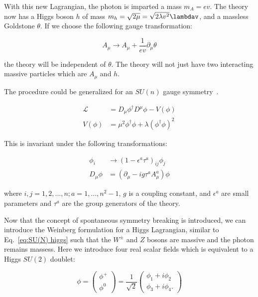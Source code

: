 With this new Lagrangian, the photon is imparted a mass $m_A = ev$. The theory now has a Higgs boson $h$ of mass $m_h = \sqrt{2\mu} =\sqrt{2\lambda v^2} \lambdav$, and a massless Goldstone $\theta$. If we choose the following gauge transformation:

\begin{equation}
\label{eq:GoldstoneGauge}
A_{\mu} \rightarrow A_{\mu} + \frac{1}{ev}\partial_{\mu}\theta
\end{equation}

the theory will be independent of $\theta$. The theory will not just have two interacting massive particles which are $A_\mu$ and $h$. 

The procedure could be generalized for an $SU(n)$ gauge symmetry~\cite{MarkusKluteLectures}. 

\begin{equation}
\begin{split}
\label{eq:SU(N) higgs}
    \mathcal{L} &= D_{\mu}\phi^{\dagger}D^{\mu}\phi - V(\phi) \\
     V(\phi) &= \mu^2\phi^{\dagger}\phi + \lambda(\phi^{\dagger}\phi)^2
\end{split}
\end{equation}

This is invariant under the following transformations:

\begin{equation}
\begin{split}
\label{eq:SU(N)transformation}
    \phi_{i} &\rightarrow (1-\epsilon^{a}\tau^{a})_{ij} \phi_j\\
    D_{\mu} \phi &= (\partial_{\mu} - ig\tau^aA^a_{\mu})\phi 
\end{split}
\end{equation}

where $i, j= 1, 2,...,n; a = 1, ..., n^2 -1$, $g$ is a coupling constant, and $\epsilon^a$ are small parameters and $\tau^a$ are the group generators of the theory. 

Now that the concept of spontaneous symmetry breaking is introduced, we can introduce the Weinberg formulation for a Higgs Lagrangian, similar to Eq.~\ref{eq:SU(N) higgs} such that the $W^{\pm}$ and $Z$ bosons are massive and the photon remains massess. Here we introduce four real scalar fields which is equivalent to a Higgs $SU(2)$ doublet:

\begin{equation}
\phi = \begin{pmatrix}
        \phi^+\\
        \phi^0
        \end{pmatrix}
    = \frac{1}{\sqrt{2}}\begin{pmatrix}
        \phi_1 + i \phi_2\\
        \phi_3 + i \phi_4.
        \end{pmatrix}
\end{equation}

